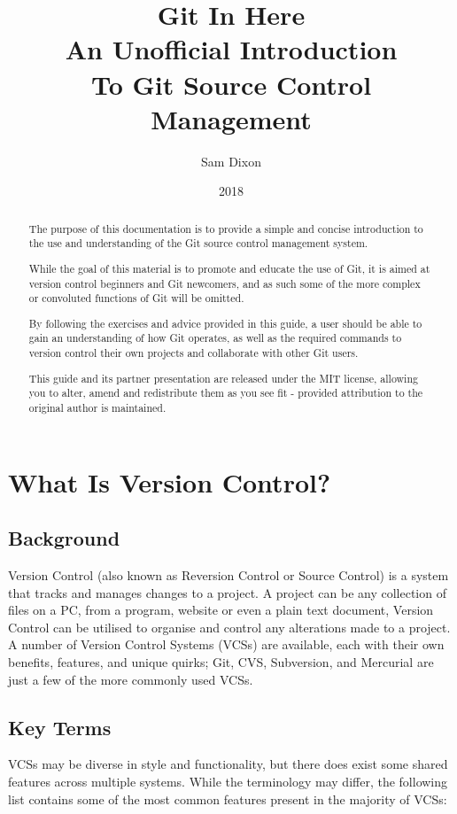 \documentclass[11pt, a4paper, draft, titlepage]{article}
\begin{document}
\title{ Git In Here\\ \large An Unofficial Introduction \\To Git Source
Control Management } \author{Sam Dixon} \date{2018} \maketitle

\begin{abstract} The purpose of this documentation is to provide a simple and
concise introduction to the use and understanding of the Git source control
management system.

While the goal of this material is to promote and educate the use of Git, it
is aimed at version control beginners and Git newcomers, and as such some of
the more complex or convoluted functions of Git will be omitted.

By following the exercises and advice provided in this guide, a user should be
able to gain an understanding of how Git operates, as well as the required
commands to version control their own projects and collaborate with other Git
users.

This guide and its partner presentation are released under the MIT license,
allowing you to alter, amend and redistribute them as you see fit - provided
attribution to the original author is maintained.  \end{abstract}

\tableofcontents 
\pagebreak


\section{What Is Version Control?}

\subsection{Background} Version Control (also known as Reversion Control or
Source Control) is a system that tracks and manages changes to a project.  A
project can be any collection of files on a PC, from a program, website or
even a plain text document, Version Control can be utilised to organise and
control any alterations made to a project.  A number of Version Control
Systems (VCSs) are available, each with their own benefits, features, and
unique quirks; Git, CVS, Subversion, and Mercurial are just a few of the more
commonly used VCSs.

\subsection{Key Terms} VCSs may be diverse in style and functionality, but
there does exist some shared features across multiple systems. While the
terminology may differ, the following list contains some of the most common
features present in the majority of VCSs:
\end{document}
